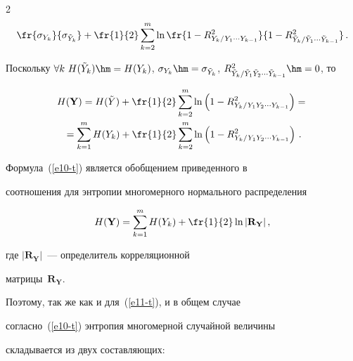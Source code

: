 \begin{multicols}{2}
\begin{multline*}
\fr{\sigma_{Y_k}}{\sigma_{\tilde{Y}_k}}+\fr{1}{2} \sum\limits_{k=2}^m \ln 

  \fr{1-R^2_{Y_k/Y_1\cdots Y_{k-1}}}{1-R^2_{\tilde{Y}_k/\tilde{Y}_1\cdots 

\tilde{Y}_{k-1}}}\,.

  \end{multline*}

  

  Поскольку $\forall k\ H(\tilde{Y}_k) \hm= H(Y_k)$, $\sigma_{Y_k}\hm= 

\sigma_{\tilde{Y}_k}$, $R^2_{\tilde{Y}_k/\tilde{Y}_1\tilde{Y}_2\cdots 

\tilde{Y}_{k-1}}\hm=0$, то

\begin{multline*}

  H(\mathbf{Y}) =H(\tilde{Y}) +\fr{1}{2}\sum\limits_{k=2}^m \ln \left( 1-

R^2_{Y_k/Y_1Y_2\cdots Y_{k-1}}\right) = {}\\

{}=\sum\limits_{k=1}^m H(Y_k) +\fr{1}{2} 

\sum\limits_{k=2}^m \ln \left (1-R^2_{Y_k/Y_1Y_2\cdots Y_{k-1}}\right)\,.

  \end{multline*}

  

  Формула~(\ref{e10-t}) является обобщением приведенного в~\cite{13-t} 

соотношения для энтропии многомерного нормального распределения

  \begin{equation}

  H(\mathbf{Y}) =\sum\limits_{k=1}^m H(Y_k) +\fr{1}{2} \ln \vert 

\mathbf{R}_{\mathbf{Y}} \vert\,,

  \label{e11-t}

  \end{equation}

  где $\vert \mathbf{R}_{\mathbf{Y}}\vert$~--- определитель корреляционной 

матрицы~$\mathbf{R}_{\mathbf{Y}}$.


  Поэтому, так же как и для~(\ref{e11-t}), и в общем случае 

  согласно~(\ref{e10-t}) энтропия многомерной случайной величины 

складывается из двух со\-став\-ля\-ющих:

  \begin{equation}


\end{equation}
\end{multicols}
